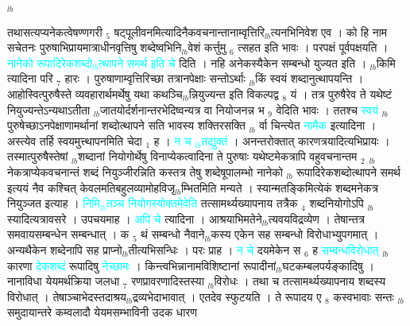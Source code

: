 \documentclass[article,12pt,a4paper]{memoir}%
\newcommand{\quotelemma}[1]{\textcolor{cyan}{#1}}
\newcounter{parCount}
\begin{document}
	{}
	\pend%
      {\tiny $_{lb}$}

	  
	  \pstart \leavevmode%
	तथासत्यप्यनेकत्वेषण्णगरी {\tiny $_{5}$} षट्पूलीवनमित्यादिनैकवचनान्तानाम्वृत्तिरि{\tiny $_{lb}$}त्यनभिनिवेश एव । को हि नाम सचेतनः पुरुषाभिप्रायमात्राधीनवृत्तिषु शब्देष्वभिनि{\tiny $_{lb}$}वेशं कर्त्तुमु {\tiny $_{6}$} त्सहत इति भावः । परपक्षं पूर्वपक्षयति । \quotelemma{नानेको रूपादिरेकशब्दो{\tiny $_{lb}$}त्थापने समर्थ इति चे} \cite[3a5]{vn-msN} दिति । नहि अनेकस्यैकेन सम्बन्धो युज्यत इति । {\tiny $_{lb}$}किमि \cite[3a5]{vn-msN} त्यादिना परि {\tiny $_{7}$} हारः । पुरुषाणाम्वृत्तिरिच्छा तत्रानपेक्षाः सन्तोऽर्थाः {\tiny $_{lb}$}किं स्वयं शब्दानुत्थापयन्ति । आहोस्वित्पुरुषैस्ते व्यवहारार्थमर्थेषु यथा कथञ्चि{\tiny $_{lb}$}न्नियुज्यन्त इति विकल्पद्व {\tiny $_{8}$} यं । तत्र पुरुषैरेव ते यथेष्टं नियुज्यन्तेऽन्यथाऽतीता {\tiny $_{lb}$}जातयोर्दर्शनान्तरभेदिष्वन्यत्र वा नियोजनन्न भ {\tiny $_{9}$} \leavevmode{} वेदिति भावः । ततश्च \quotelemma{स्वयं} {\tiny $_{lb}$} \cite[3a6]{vn-msN} पुरुषेच्छाऽनपेक्षाणामर्थानां शब्दोत्थापने सति भावस्य शक्तिरसक्ति {\tiny $_{lb}$} र्वा चिन्त्येत \quotelemma{नामैक} इत्यादिना । अस्त्येव तर्हि स्वयमुत्त्थापनमिति चेदा {\tiny $_{1}$} ह । \quotelemma{न च {\tiny $_{lb}$}तद्युक्तं} \cite[3a6]{vn-msN} । अनन्तरोक्तात् कारणत्रयादित्यभिप्रायः । तस्मात्पुरुषैस्तेषां {\tiny $_{lb}$}शब्दानां नियोगोर्थेषु विनाप्येकत्वादिना ते पुरुषाः यथेष्टमेकत्रापि वहुवचनान्तम {\tiny $_{2}$} {\tiny $_{lb}$}नेकत्राप्येकवचनान्तं शब्दं नियुञ्जीरन्निति कस्तत्र तेषु शब्देषूपालम्भो नानेको {\tiny $_{lb}$} \leavevmode{} रूपादिरेकशब्दोत्थापने समर्थ इत्ययं नैव कश्चित् केवलमतिबहुलव्यामोहविजृ{\tiny $_{lb}$}म्भितमिति मन्यते । स्यान्मतङ्किमित्येकं शब्दमनेकत्र नियुञ्जत इत्याह । \quotelemma{निमि{\tiny $_{lb}$}तञ्च नियोगस्योक्तमेवेति} \cite[3a6]{vn-msN} तत्सामर्थ्यख्यापनाय तत्रैक {\tiny $_{4}$} शब्दनियोगोऽपि {\tiny $_{lb}$}स्यादित्यत्रावसरे । उपचयमाह । \quotelemma{अपि चे} \cite[3a7]{vn-msN} त्यादिना । आश्रयाभिमतेने{\tiny $_{lb}$}त्यवयविद्रव्येण । तेषान्तत्र समवायसम्बन्धेन सम्बन्धात् । क {\tiny $_{5}$} थं सम्बन्धो नैवाने{\tiny $_{lb}$}कस्य एकेन सह सम्बन्धो विरोधाभ्युपगमात् । अन्यथैकेन शब्देनापि सह प्राप्नो{\tiny $_{lb}$}तीत्यभिसन्धिः । परः प्राह । \quotelemma{न चे} \cite[3a7]{vn-msN} दयमेकेन स {\tiny $_{6}$} ह \quotelemma{सम्बन्धविरोधात्} {\tiny $_{lb}$}कारणा \quotelemma{देकशब्दं} रूपादिषु \quotelemma{नेच्छामः} । किन्त्वभिन्नानामविशिष्टानां रूपादीनां{\tiny $_{lb}$}घटकम्बलपर्यङ्कादिषु । नानाविधा येयमर्थक्रिया जलधा {\tiny $_{7}$} रणप्रावरणादिस्तस्या {\tiny $_{lb}$}विरोधः । तथा च तत्सामर्थ्यख्यापनाय शब्दस्य विरोधात् । तेषाञ्चाभेदस्तदाश्रय{\tiny $_{lb}$}द्रव्यभेदाभावात् । एतदेव स्फुटयति । ते रूपादय ए {\tiny $_{8}$} \leavevmode{} कस्वभावाः सन्तः {\tiny $_{lb}$}समुदायान्तरे कम्वलादौ येयमसम्भाविनी उदक धारण 
\end{document}
